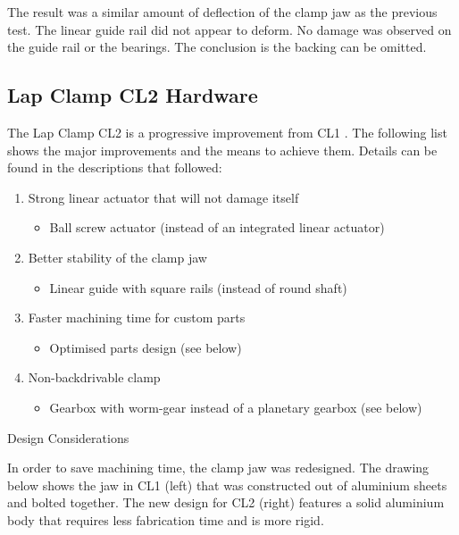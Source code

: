 The result was a similar amount of deflection of the clamp jaw as the previous test. The linear guide rail did not appear to deform. No damage was observed on the guide rail or the bearings. The conclusion is the backing can be omitted.

\subsection{Lap Clamp CL2 Hardware}
\label{subsection:exploration-2-lap-clamp-cl2-hardware}

The Lap Clamp CL2 is a progressive improvement from CL1 . The following list shows the major improvements and the means to achieve them. Details can be found in the descriptions that followed:
\begin{enumerate}
\item Strong linear actuator that will not damage itself
    \begin{itemize}
        \item Ball screw actuator (instead of an integrated linear actuator) 
    \end{itemize}
    \item Better stability of the clamp jaw 
    \begin{itemize}
        \item Linear guide with square rails (instead of round shaft) 
    \end{itemize}
    \item Faster machining time for custom parts
    \begin{itemize}
        \item Optimised parts design (see below)
    \end{itemize}
    \item Non-backdrivable clamp
    \begin{itemize}
        \item Gearbox with worm-gear instead of a planetary gearbox (see below)
    \end{itemize}
\end{enumerate}

Design Considerations

In order to save machining time, the clamp jaw was redesigned. The drawing below shows the jaw in CL1 (left) that was constructed out of aluminium sheets and bolted together. The new design for CL2 (right) features a solid aluminium body that requires less fabrication time and is more rigid. 

